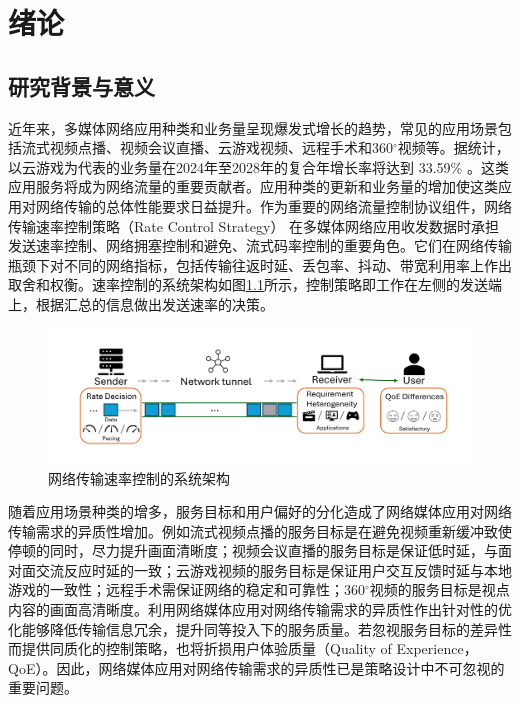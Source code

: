 
\chapter{绪论}

\section{研究背景与意义}
近年来，多媒体网络应用种类和业务量呈现爆发式增长的趋势，常见的应用场景包括流式视频点播、视频会议直播、云游戏视频、远程手术和360$^{\circ}$视频等。据统计，以云游戏为代表的业务量在2024年至2028年的复合年增长率将达到 33.59\% \cite{Global-Cloud-Gaming-Market-Size}。这类应用服务将成为网络流量的重要贡献者。应用种类的更新和业务量的增加使这类应用对网络传输的总体性能要求日益提升。作为重要的网络流量控制协议组件，网络传输速率控制策略（Rate Control Strategy） 在多媒体网络应用收发数据时承担发送速率控制、网络拥塞控制和避免、流式码率控制的重要角色。它们在网络传输瓶颈下对不同的网络指标，包括传输往返时延、丢包率、抖动、带宽利用率上作出取舍和权衡。速率控制的系统架构如图\ref{fig:teaser_system_archi}所示，控制策略即工作在左侧的发送端上，根据汇总的信息做出发送速率的决策。


\begin{figure} [ht]
\centering
\includegraphics[width=\textwidth]{figures/chap01/system_archi.pdf} 
\caption{网络传输速率控制的系统架构}
\label{fig:teaser_system_archi}
\end{figure}


随着应用场景种类的增多，服务目标和用户偏好的分化造成了网络媒体应用对网络传输需求的异质性增加。例如流式视频点播的服务目标是在避免视频重新缓冲致使停顿的同时，尽力提升画面清晰度；视频会议直播的服务目标是保证低时延，与面对面交流反应时延的一致；云游戏视频的服务目标是保证用户交互反馈时延与本地游戏的一致性；远程手术需保证网络的稳定和可靠性；360$^{\circ}$视频的服务目标是视点内容的画面高清晰度。利用网络媒体应用对网络传输需求的异质性作出针对性的优化能够降低传输信息冗余，提升同等投入下的服务质量。若忽视服务目标的差异性而提供同质化的控制策略，也将折损用户体验质量（Quality of Experience，QoE）\cite{zhang2019e2e}。因此，网络媒体应用对网络传输需求的异质性已是策略设计中不可忽视的重要问题。

